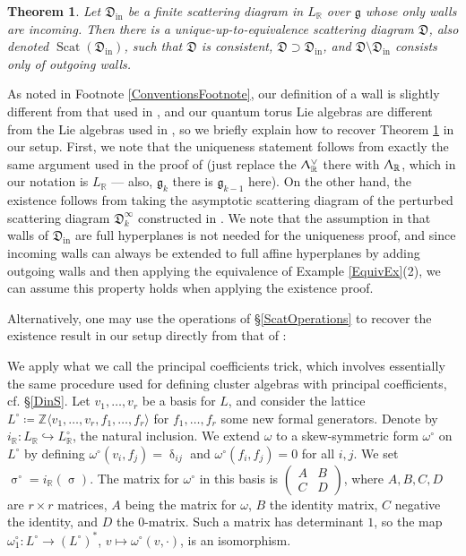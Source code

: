\documentclass{amsart}
\DeclareMathOperator{\In}{in}
\DeclareMathOperator{\scat}{Scat}
\let\bb=\mathbb
\let\rar=\rightarrow
\let\f=\mathfrak
\renewcommand{\delta}{\updelta}
\renewcommand{\sigma}{\upsigma}
\renewcommand{\Lambda}{\Uplambda}
\theoremstyle{plain}%
\newtheorem{thm}{Theorem}[section]
\theoremstyle{definition}
\theoremstyle{remark}
\begin{document}
\begin{thm}\label{KSGS}
Let $\f{D}_{\In}$ be a finite scattering diagram in $L_{\bb{R}}$ over $\f{g}$ whose only walls are incoming.  Then there is a unique-up-to-equivalence scattering diagram $\f{D}$, also denoted $\scat(\f{D}_{\In})$, such that $\f{D}$ is consistent, $\f{D} \supset \f{D}_{\In}$, and $\f{D}\setminus \f{D}_{\In}$ consists only of outgoing walls.
\end{thm}

As noted in Footnote \ref{ConventionsFootnote}, our definition of a wall is slightly different from that used in \cite{WCS,GHKK}, and our quantum torus Lie algebras are different from the Lie algebras used in \cite{GS11}, so we briefly explain how to recover Theorem \ref{KSGS} in our setup.  First, we note that the uniqueness statement follows from exactly the same argument used in the proof of \cite[Thm. 3.5]{CM} (just replace the $\Lambda_{\bb{R}}^{\vee}$ there with $\Lambda_{\bb{R}}$, which in our notation is $L_{\bb{R}}$ --- also, $\f{g}_k$ there is $\f{g}_{k-1}$ here).   On the other hand, the existence follows from taking the asymptotic scattering diagram of the perturbed scattering diagram $\f{D}_k^{\infty}$ constructed in \cite[\S 3.2.2]{Man3}.  We note that the assumption in \cite[Thm. 3.5]{CM} that walls of $\f{D}_{\In}$ are full hyperplanes is not needed for the uniqueness proof, and since incoming walls can always be extended to full affine hyperplanes by adding outgoing walls and then applying the equivalence of Example \ref{EquivEx}(2), we can assume this property holds when applying the existence proof.

Alternatively, one may use the operations of \S \ref{ScatOperations} to recover the existence result in our setup directly from that of \cite{WCS}: 

We apply what we call the principal coefficients trick, which involves essentially the same procedure used for defining cluster algebras with principal coefficients, cf. \S \ref{DinS}.  Let $v_1,\ldots,v_r$ be a basis for $L$, and consider the lattice  $L^{\circ}\coloneqq \bb{Z}\langle v_1,\ldots,v_r,f_1,\ldots,f_r\rangle$ for $f_1,\ldots,f_r$ some new formal generators.  Denote by $i_{\bb{R}}\colon L_{\bb{R}}\hookrightarrow L^{\circ}_{\bb{R}}$, the natural inclusion.  We extend $\omega$ to a skew-symmetric form $\omega^{\circ}$ on $L^{\circ}$ by defining $\omega^{\circ}(v_i,f_j)=\delta_{ij}$ and $\omega^{\circ}(f_i,f_j)=0$ for all $i,j$.  We set $\sigma^{\circ}=i_{\bb{R}}(\sigma)$.  The matrix for $\omega^{\circ}$ in this basis is $\left(\begin{matrix}A & B \\ C & D \end{matrix}\right)$, where $A,B,C,D$ are $r\times r$ matrices, $A$ being the matrix for $\omega$, $B$ the identity matrix, $C$ negative the identity, and $D$ the $0$-matrix.  Such a matrix has determinant $1$, so the map $\omega_1^{\circ}\colon L^{\circ}\rar (L^{\circ})^*$, $v\mapsto \omega^{\circ}(v,\cdot)$, is an isomorphism.  
\end{document}
